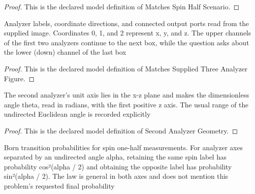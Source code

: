 \begin{proof}
  This is the declared model definition of Matches Spin Half Scenario.
\end{proof}
\begin{definition}
  \label{def:physics:phyx-mini-0542:phyxminiproblems-problemphyxmini0542-matchessuppliedthreeanalyzerfigure}
  Analyzer labels, coordinate directions, and connected output ports read from the supplied image. Coordinates 0, 1, and 2 represent x, y, and z. The upper channels of the first two analyzers continue to the next box, while the question asks about the lower (down) channel of the last box
\end{definition}
\begin{proof}
  This is the declared model definition of Matches Supplied Three Analyzer Figure.
\end{proof}
\begin{definition}
  \label{def:physics:phyx-mini-0542:phyxminiproblems-problemphyxmini0542-secondanalyzergeometry}
  The second analyzer's unit axis lies in the x-z plane and makes the dimensionless angle theta, read in radians, with the first positive z axis. The usual range of the undirected Euclidean angle is recorded explicitly
\end{definition}
\begin{proof}
  This is the declared model definition of Second Analyzer Geometry.
\end{proof}
\begin{definition}
  \label{def:physics:phyx-mini-0542:phyxminiproblems-problemphyxmini0542-spinhalfbornrule}
  Born transition probabilities for spin one-half measurements. For analyzer axes separated by an undirected angle alpha, retaining the same spin label has probability cos²(alpha / 2) and obtaining the opposite label has probability sin²(alpha / 2). The law is general in both axes and does not mention this problem's requested final probability
\end{definition}
